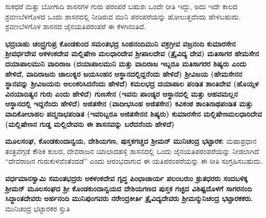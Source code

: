 ಸುಕಧರೆ ಮತ್ತು ಬೋಗಾದಿ ಶಾಸನಗಳ ಗುರು ಪರಂಪರೆ ಬಹುಶಃ ಒಂದೇ ರೀತಿ ಇದ್ದು, ಅದು ಇದೇ ಕಾಲದ ಶ್ರವಣಬೆಳಗೊಳದ ಒಂದು ಶಾಸನದಲ್ಲಿ ನೀಡಿರುವ ಮುನಿ ಪರಂಪರೆಯನ್ನು ಹೋಲುತ್ತದೆಂದು ಹೇಳಬಹುದು. ಶ್ರವಣಬೆಳಗೊಳ ಶಾಸನದ ಜೈನಯತಿಪರಂಪರೆ ಈ ಕೆಳಗಿನಂತಿದೆ.

\textbf{ಭದ್ರಬಾಹು \general{\enginline{-}} ಚಂದ್ರ್ರಗುಪ್ರ \general{\enginline{-}} ಕೊಂಡಕುಂದ \general{\enginline{-}} ಸಮಂತಭದ್ರ \general{\enginline{-}} ಸಿಂಹನಂದಿಮುನಿ \general{\enginline{-}} ವಕ್ರಗ್ರೀವ \general{\enginline{-}} ವಜ್ರನಂದಿ \general{\enginline{-}} ಕುಮಾರಸೇನ \general{\enginline{-}} ಶ‍್ರೀವರ್ಧದೇವ \general{\enginline{-}} ಅಕಳಂಕದೇವ \general{\enginline{-}} ಮಲ್ಲಿಷೇಣ ಮಲಧಾರಿದೇವ \general{\enginline{-}} ಶ‍್ರೀಪಾಲದೇವ (ತ್ರೈವಿದ್ಯ ದೇವ) \general{\enginline{-}} ಮತಿಸಾಗರ \general{\enginline{-}} ಹೇಮಸೇನ \general{\enginline{-}} ದಯಾಪಾಲಮುನಿ \general{\enginline{-}} ವಾದಿರಾಜ (ದಯಾಪಾಲಮುನಿ ಮತ್ತು ವಾದಿರಾಜ ಇಬ್ಬರೂ ಮತಿಸಾಗರರ ಶಿಷ್ಯರು ಎಂದು ಹೇಳಿದೆ, ವಾದಿರಾಜನು ಚಾಲುಕ್ಯರ ಜಯಸಿಂಹನ ಆಸ್ಥಾನದಲ್ಲಿದ್ದನೆಂದು ಹೇಳಿದೆ) \general{\enginline{-}} ಶ‍್ರೀವಿಜಯ (ಹೇಮಸೇನನ ಸ್ಥಾನವನ್ನು ಶ‍್ರೀವಿಜಯನು ಅಲಂಕರಿಸಿದನೆಂದು ಹೇಳಿದೆ) \general{\enginline{-}} ಕಮಲಭದ್ರ \general{\enginline{-}} ದಯಾಪಾಲ ಪಂಡಿತ \general{\enginline{-}} ಶಾಂತಿದೇವ (ಹೊಯ್ಸಳ ವಿನಯಾದಿತ್ಯನ ಗುರು ಎಂದು ಹೇಳಿದೆ) \general{\enginline{-}} ಗುಣಸೇನ (ಇವನು ಪಾಂಡ್ಯರ ಆಸ್ಥಾನದಲ್ಲಿ ಮತ್ತು ಆಹವಮಲ್ಲನ ಆಸ್ಥಾನದಲ್ಲಿ ಇದ್ದನೆಂದು ಹೇಳಿದೆ) \general{\enginline{-}} ಅಜಿತಸೇನ (ವಾದೀಭಸಿಂಹ ಅಜಿತಸೇನ) \general{\enginline{-}} ಕವಿಕಂಠ ಶಾಂತಿನಾಥಪಂಡಿತ ಮತ್ತು ವಾದಿಕೋಲಾಹಲ ಪದ್ಮನಾಭಪಂಡಿತ (ಇವರಿಬ್ಬರೂ ಅಜಿತಸೇನನ ಶಿಷ್ಯರು) \general{\enginline{-}} ಕುಮಾರಸೇನ \general{\enginline{-}}\general{\break } ಮಲ್ಲಿಷೇಣಮಲಧಾರಿದೇವ \general{\enginline{-}} (ಮಲ್ಲಿಷೇಣನ ಗುಡ್ಡ ಮಲ್ಲಿದೇವನು ಈ ಶಾಸನವನ್ನು ಬರೆದನೆಂದು ಹೇಳಿದೆ)}

\textbf{ಮೂಲಸಂಘ, ಕೊಂಡಕುಂದಾನ್ವಯ, ದೇಶಿಯಗಣ, ಪುಸ್ತಕಗಚ್ಚದ ಶ‍್ರೀಮನ್​ ಮುನಿಚಂದ್ರ ಭಟ್ಟಾರಕ:} ಮಹಾಪ್ರಧಾನ ತಂತ್ರವೆಗ್ಗಡೆ ಕೌಶಿಕ ಕುಲದ, ದೇವರಾಜನ ಯಾಲಾದಹಳ್ಳಿ ಶಾಸನದಲ್ಲಿ ಒಂದು ಜೈನಯತಿಪರಂಪರೆಯನ್ನು ನೀಡಲಾಗಿದೆ “ದೇವರಾಜನ ಗುರುಕುಳವೆಂತೆಂದಡೆ” ಎಂದು ಆರಂಭವಾಗುವ ಈ ಯತಿಪರಂಪರೆಯನ್ನು ಈ ರೀತಿ ಸಂಗ್ರಹಿಸಬಹುದು.

\textbf{ವರ್ಧಮಾನಸ್ವಾಮಿ \general{\enginline{-}} ಸಮಂತಭದ್ರರು \general{\enginline{-}} ಅಕಳಂಕದೇವ \general{\enginline{-}} ಗೃದ್ಧ ಪಿಂಛಾಚಾರ್ಯ \general{\enginline{-}} ಪಲಂಬರುಂ ಶ್ರುತಧರರು ಸಂದಬಳಿಕ್ಕ ಶ‍್ರೀಮನ್​ ಮೂಲಸಂಘದ ಶ‍್ರೀ ಕೊಂಡಕುಂದಾನ್ವಯದ ದೇಶಿಯಗಣದ ಪುಸ್ತಕ ಗಚ್ಛದ ವಿಶಿಷ್ಟದೊಳಗೆ \general{\enginline{-}} ಸಾಗರನಂದಿ ಸಿದ್ಧಾಂತದೇವರು \general{\enginline{-}} ಅರ್ಹನಂದಿ ಮುನಿಪುಂಗವರು \general{\enginline{-}} ನರೇಂದ್ರಕೀರ್ತಿ ತ್ರೈವಿದ್ಯದೇವರು \general{\enginline{-}} ಶ‍್ರೀಮನ್ಮುನಿಚಂದ್ರ ಭಟ್ಟಾರಕಕರು.} ಮುನಿಚಂದ್ರ ಭಟ್ಟಾರಕರ ಸ್ತುತಿ

